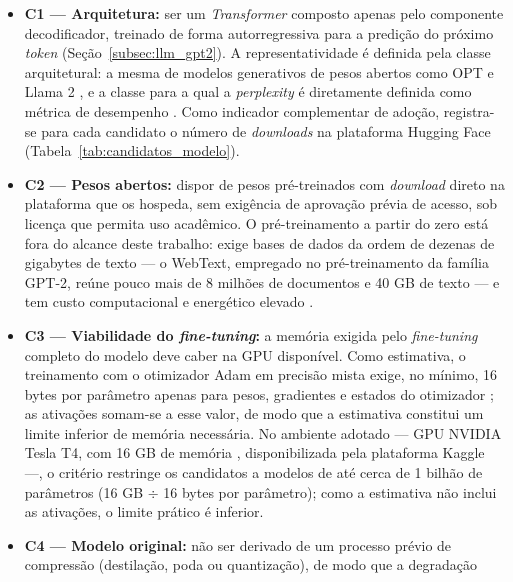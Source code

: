 \begin{itemize}
    \item \textbf{C1 --- Arquitetura:} ser um \textit{Transformer} composto apenas pelo
          componente decodificador, treinado de forma autorregressiva para a predição do
          próximo \textit{token} (Seção~\ref{subsec:llm_gpt2}). A representatividade é
          definida pela classe arquitetural: a mesma de modelos generativos de pesos
          abertos como OPT e Llama 2 \cite{Zhang2022,Touvron2023}, e a classe para a qual
          a \textit{perplexity} é diretamente definida como métrica de desempenho
          \cite{HuggingFacePerplexity}. Como indicador complementar de adoção, registra-se para cada
          candidato o número de \textit{downloads} na plataforma Hugging Face
          (Tabela~\ref{tab:candidatos_modelo}).
    \item \textbf{C2 --- Pesos abertos:} dispor de pesos pré-treinados com \textit{download}
          direto na plataforma que os hospeda, sem exigência de aprovação prévia de acesso,
          sob licença que permita uso acadêmico. O pré-treinamento a partir do zero está
          fora do alcance deste trabalho: exige bases de dados da ordem de dezenas de gigabytes de
          texto --- o WebText, empregado no pré-treinamento da família GPT-2, reúne pouco
          mais de 8 milhões de documentos e 40 GB de texto \cite{Radford2019} --- e tem
          custo computacional e energético elevado \cite{Strubell2019}.
    \item \textbf{C3 --- Viabilidade do \textit{fine-tuning}:} a memória exigida pelo
          \textit{fine-tuning} completo do modelo deve caber na GPU disponível. Como
          estimativa, o treinamento com o otimizador Adam em precisão mista exige, no
          mínimo, 16 bytes por parâmetro apenas para pesos, gradientes e estados do
          otimizador \cite{Rajbhandari2020}; as ativações somam-se a esse valor, de modo
          que a estimativa constitui um limite inferior de memória necessária. No ambiente
          adotado --- GPU NVIDIA Tesla T4, com 16 GB de memória \cite{NVIDIA2019T4},
          disponibilizada pela plataforma Kaggle ---, o critério restringe os candidatos a
          modelos de até cerca de 1 bilhão de parâmetros (16 GB $\div$ 16 bytes por parâmetro);
          como a estimativa não inclui as ativações, o limite prático é inferior.
    \item \textbf{C4 --- Modelo original:} não ser derivado de um processo prévio de
          compressão (destilação, poda ou quantização), de modo que a degradação

\end{itemize}
